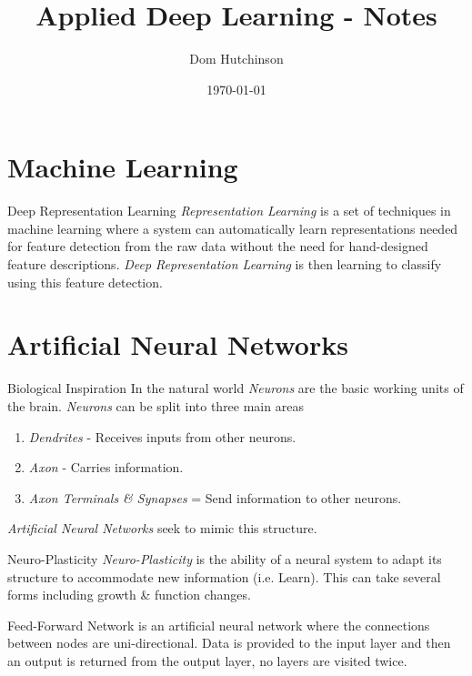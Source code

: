 \documentclass[11pt,a4paper]{article}
\begin{document}
\title{Applied Deep Learning - Notes}
\author{Dom Hutchinson}
\date{\today}
\maketitle

\tableofcontents\newpage

\section{Machine Learning}

  \begin{definition}{Deep Representation Learning}
    \textit{Representation Learning} is a set of techniques in machine learning where a system can automatically learn representations needed for feature detection from the raw data without the need for hand-designed feature descriptions. \textit{Deep Representation Learning} is then learning to classify using this feature detection.
  \end{definition}

\section{Artificial Neural Networks}

  \begin{remark}{Biological Inspiration}
    In the natural world \textit{Neurons} are the basic working units of the brain. \textit{Neurons} can be split into three main areas
    \begin{enumerate}
      \item \textit{Dendrites} - Receives inputs from other neurons.
      \item \textit{Axon} - Carries information.
      \item \textit{Axon Terminals \& Synapses} = Send information to other neurons.
    \end{enumerate}
    \textit{Artificial Neural Networks} seek to mimic this structure.
  \end{remark}

  \begin{definition}{Neuro-Plasticity}
    \textit{Neuro-Plasticity} is the ability of a neural system to adapt its structure to accommodate new information (i.e. Learn). This can take several forms including growth \& function changes.
  \end{definition}

  \begin{definition}{Feed-Forward Network} is an artificial neural network where the connections between nodes are uni-directional. Data is provided to the input layer and then an output is returned from the output layer, no layers are visited twice.
  \end{definition}
\end{document}
